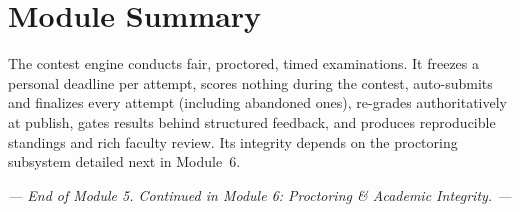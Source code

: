 \documentclass[12pt,a4paper,oneside]{report}
\begin{document}
\section{Module Summary}
The contest engine conducts fair, proctored, timed examinations. It freezes a
personal deadline per attempt, scores nothing during the contest, auto-submits
and finalizes every attempt (including abandoned ones), re-grades authoritatively
at publish, gates results behind structured feedback, and produces reproducible
standings and rich faculty review. Its integrity depends on the proctoring
subsystem detailed next in Module~6.

\vspace{0.6cm}
\begin{center}
\textit{--- End of Module 5. Continued in Module 6: Proctoring \& Academic Integrity. ---}
\end{center}
\end{document}
